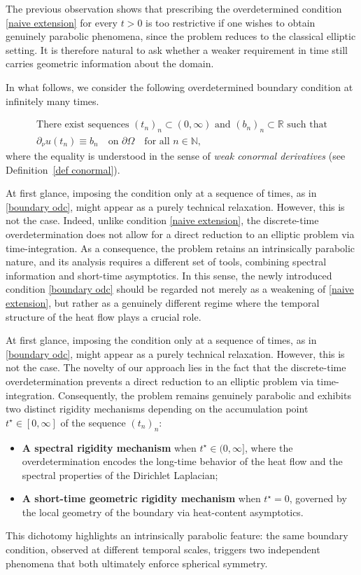 \documentclass[a4paper,11pt]{article}
\numberwithin{equation}{section}
\begin{document}
The previous observation shows that prescribing the overdetermined condition \eqref{naive extension} for every $t>0$ is too restrictive if one wishes to obtain genuinely parabolic phenomena, since the problem reduces to the classical elliptic setting. It is therefore natural to ask whether a weaker requirement in time still carries geometric information about the domain.

In what follows, we consider the following overdetermined boundary condition at infinitely many times.

\begin{equation}\label{boundary odc}
\begin{aligned}
\text{There exist sequences $(t_n)_{n}\subset (0,\infty)$ and $(b_n)_{n}\subset\mathbb{R}$ such that}\\
\partial_\nu u(t_n) \equiv b_n \quad \text{on }\partial\Omega \quad \text{for all }n\in\mathbb{N},
\end{aligned}
\end{equation}
where the equality is understood in the sense of \emph{weak conormal derivatives} (see Definition~\ref{def conormal}). 

At first glance, imposing the condition only at a sequence of times, as in \eqref{boundary odc}, might appear as a purely technical relaxation. However, this is not the case. Indeed, unlike condition \eqref{naive extension}, the discrete-time overdetermination does not allow for a direct reduction to an elliptic problem via time-integration. As a consequence, the problem retains an intrinsically parabolic nature, and its analysis requires a different set of tools, combining spectral information and short-time asymptotics. In this sense, the newly introduced condition \eqref{boundary odc} should be regarded not merely as a weakening of \eqref{naive extension}, but rather as a genuinely different regime where the temporal structure of the heat flow plays a crucial role.

At first glance, imposing the condition only at a sequence of times, as in \eqref{boundary odc}, might appear as a purely technical relaxation. However, this is not the case. The novelty of our approach lies in the fact that the discrete-time overdetermination prevents a direct reduction to an elliptic problem via time-integration. Consequently, the problem remains genuinely parabolic and exhibits two distinct rigidity mechanisms depending on the accumulation point $t^\star \in [0, \infty]$ of the sequence $(t_n)_n$:
\begin{itemize}
    \item \textbf{A spectral rigidity mechanism} when $t^\star \in (0, \infty]$, where the overdetermination encodes the long-time behavior of the heat flow and the spectral properties of the Dirichlet Laplacian;
    \item \textbf{A short-time geometric rigidity mechanism} when $t^\star = 0$, governed by the local geometry of the boundary via heat-content asymptotics.
\end{itemize}
This dichotomy highlights an intrinsically parabolic feature: the same boundary condition, observed at different temporal scales, triggers two independent phenomena that both ultimately enforce spherical symmetry.
\end{document}

